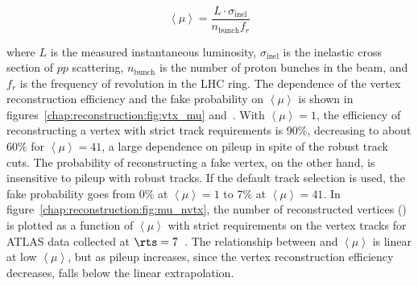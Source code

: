 \begin{equation}
\left \langle \mu \right \rangle = \frac{L\cdot\sigma_{\textrm{inel}}}{n_{\textrm{bunch}}f_r}
\end{equation}

\noindent
where $L$ is the measured instantaneous luminosity, $\sigma_{\textrm{inel}}$ is
the inelastic cross section of $pp$ scattering, $n_{\textrm{bunch}}$
is the number of proton bunches in the beam, and $f_r$ is the
frequency of revolution in the LHC ring. The dependence of the vertex reconstruction
efficiency and the fake probability on $\left \langle \mu \right \rangle$ is shown in
figures~\ref{chap:reconstruction:fig:vtx_mu}
and~. With
$\left \langle \mu \right \rangle=1$, the efficiency of reconstructing a vertex with strict track
requirements is 90\%, decreasing to about 60\% for $\left \langle \mu \right \rangle=41$, a large
dependence on pileup in spite of the robust track cuts. The
probability of reconstructing a fake vertex, on the other hand, is
insensitive to pileup with robust tracks. If the default track
selection is used, the fake probability goes from 0\% at $\left \langle \mu \right \rangle=1$ to
$7\%$ at $\left \langle \mu \right \rangle=41$. In figure~\ref{chap:reconstruction:fig:mu_nvtx},
the number of reconstructed vertices (\nvtx) is plotted as a function
of $\left \langle \mu \right \rangle$ with strict requirements on the vertex tracks for ATLAS data
collected at $\rts=7$~\tev. The relationship between \nvtx and $\left \langle \mu \right \rangle$
is linear at low $\left \langle \mu \right \rangle$, but as pileup increases, since the vertex reconstruction
efficiency decreases, \nvtx falls below the linear extrapolation. 

